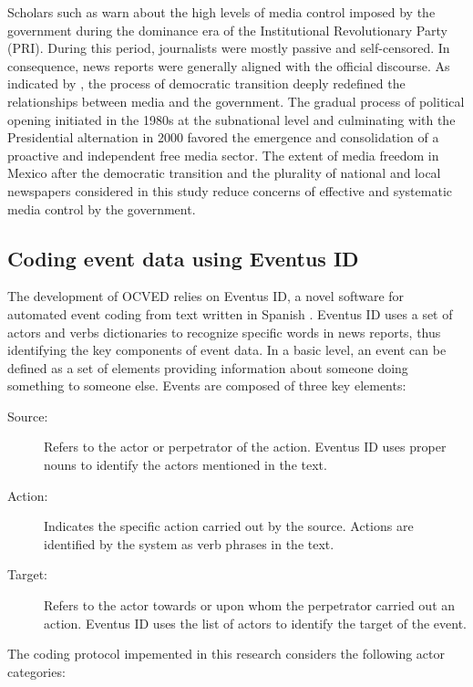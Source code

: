 \documentclass[12pt,letterpaper]{article}
\begin{document}
Scholars such as \citet{Hallin2000} warn about the high levels of media control imposed by the government during the dominance era of the Institutional Revolutionary Party (PRI). During this period, journalists were mostly passive and self-censored. In consequence, news reports were generally  aligned with the official discourse. As indicated by \citet{Lawson2002}, the process of democratic transition deeply redefined the relationships between media and the government. The gradual process of political opening initiated in the 1980s at the subnational level and culminating with the Presidential alternation in 2000 favored the emergence and consolidation of a proactive and independent free media sector. The extent of media freedom in Mexico after the democratic transition and the plurality of national and local newspapers considered in this study reduce concerns of effective and systematic media control by the government.   




\subsection{Coding event data using Eventus ID}

The development of OCVED relies on Eventus ID, a novel software for automated event coding from text written in Spanish \citep{Osorio2014}. Eventus ID uses a set of actors and verbs dictionaries to recognize specific words in news reports, thus identifying the key components of event data. In a basic level, an event can be defined as a set of elements providing information about someone doing something to someone else. Events are composed of three key elements:
\begin{description}
    \item[Source:] Refers to the actor or perpetrator of the action. Eventus ID uses proper nouns to identify the actors mentioned in the text.
    \item[Action:] Indicates the specific action carried out by the source. Actions are identified by the system as verb phrases in the text.
    \item[Target:] Refers to the actor towards or upon whom the perpetrator carried out an action. Eventus ID uses the list of actors to identify the target of the event.
\end{description}



The coding protocol impemented in this research considers the following actor categories:
\end{document}
